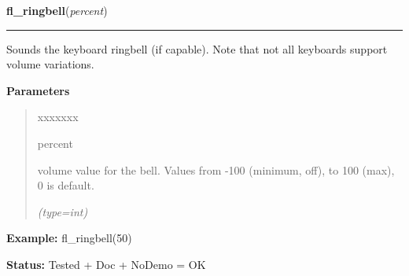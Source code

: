     \label{xformslib:flbasic:fl_ringbell}

    \vspace{0.5ex}

\hspace{.8\funcindent}\begin{boxedminipage}{\funcwidth}

    \raggedright \textbf{fl\_ringbell}(\textit{percent})

    \vspace{-1.5ex}

    \rule{\textwidth}{0.5\fboxrule}
\setlength{\parskip}{2ex}
    Sounds the keyboard ringbell (if capable). Note that not all keyboards 
    support volume variations.

\setlength{\parskip}{1ex}
      \textbf{Parameters}
      \vspace{-1ex}

      \begin{quote}
        \begin{Ventry}{xxxxxxx}

          \item[percent]

          volume value for the bell. Values from -100 (minimum, off), to 
          100 (max), 0 is default.

            {\it (type=int)}

        \end{Ventry}

      \end{quote}

\textbf{Example:} fl\_ringbell(50)



\textbf{Status:} Tested + Doc + NoDemo = OK



    \end{boxedminipage}

    \label{xformslib:flbasic:fl_gettime}

    \vspace{0.5ex}

